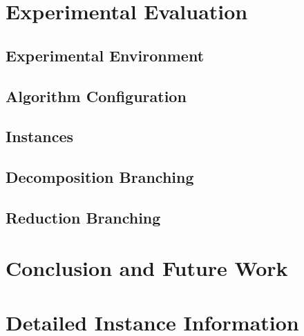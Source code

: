 \documentclass[a4paper,UKenglish,cleveref, autoref, thm-restate]{lipics-v2021}
\begin{document}
\section{Experimental Evaluation}

\subsection{Experimental Environment}

\subsection{Algorithm Configuration}

\subsection{Instances}

\subsection{Decomposition Branching}

\subsection{Reduction Branching}

\section{Conclusion and Future Work}





\appendix

\section{Detailed Instance Information}
\end{document}
